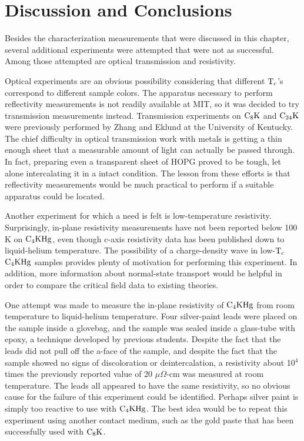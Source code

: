 \section{Discussion and Conclusions}
\label{chardisc}

        Besides the characterization measurements that were discussed in this
chapter,  several  additional experiments were  attempted that were not  as
successful.    Among   those attempted   are    optical   transmission  and
resistivity.

        Optical experiments  are an   obvious possibility considering  that
different $\rm T_c$'s correspond to different sample colors.  The apparatus
necessary to perform reflectivity measurements  is not readily available at
MIT,   so   it  was   decided   to  try  transmission measurements instead.
Transmission experiments on  $\rm C_8K$ and  $\rm C_{24}K$ were  previously
performed by Zhang and Eklund at the  University of Kentucky.\cite{zhang87}
The chief difficulty in optical transmission work with metals  is getting a
thin enough sheet that a measurable amount of light  can actually be passed
through.  In fact, preparing even a transparent  sheet of HOPG proved to be
tough,  let alone intercalating it in  a intact condition.  The lesson from
these efforts is that reflectivity  measurements would be much practical to
perform if a suitable apparatus could be located.

        Another  experiment for which a  need   is felt is  low-temperature
resistivity.  Surprisingly, in-plane resistivity measurements have not been
reported below 100 K on $\rm  C_4KHg$,\cite{elmakrini80} even though c-axis
resistivity    data  has      been   published   down    to   liquid-helium
temperature.\cite{fischer83} The possibility  of  a charge-density wave  in
low-$\rm T_c$  $\rm   C_4KHg$ samples\cite{delong83}   provides  plenty  of
motivation  for performing this  experiment.  In addition, more information
about normal-state  transport would be  helpful  in  order  to compare  the
critical field data to existing theories.\cite{orlando79}

        One attempt was made  to  measure the in-plane resistivity  of $\rm
C_4KHg$   from  room  temperature  to   liquid-helium   temperature.   Four
silver-paint  leads were placed  on the sample  inside a glovebag,  and the
sample was sealed inside a glass-tube with epoxy, a  technique developed by
previous students.\cite{Z260} Despite the fact  that the leads did not pull
off the a-face of the sample, and despite  the fact  that the sample showed
no  signs of discoloration  or deintercalation, a resistivity  about 10$^4$
times    the     previously   reported     value      of         20    $\mu
\Omega$-cm\cite{elmakrini80b} was measured at room temperature.   The leads
all appeared to  have the same resistivity,  so  no obvious  cause for  the
failure of this  experiment could  be identified.  Perhaps  silver paint is
simply too reactive to use  with $\rm C_4KHg$.  The  best  idea would be to
repeat this experiment using another contact medium, such as the gold paste
that has been successfully used with $\rm C_8K$.\cite{koike80}

